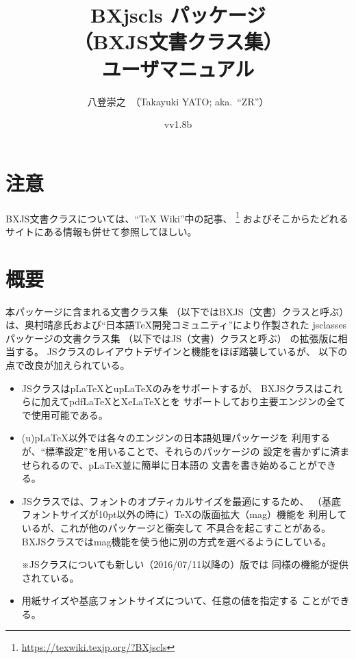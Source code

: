 \documentclass[a4paper]{ltjsarticle}
\renewcommand*{\XeLaTeX}{XeLaTeX}}
\newcommand{\PkgVersion}{v1.8b}
\newcommand{\PkgDate}{2018/04/14}
\newcommand{\Pkg}[1]{\textsf{#1}}
\newcommand{\Note}{\par\noindent ※}
\newcommand{\jemph}{\textsf}
\providecommand{\pLaTeX}{p\LaTeX}
\providecommand{\upLaTeX}{u\pLaTeX}
\providecommand{\pdfLaTeX}{pdf\LaTeX}
\begin{document}
\title{\Pkg{BXjscls} パッケージ\\
  （BXJS文書クラス集）\\
  ユーザマニュアル}
\author{八登崇之\ （Takayuki YATO; aka.~``ZR''）}
\date{v\PkgVersion\quad[\PkgDate]}
\maketitle
\tableofcontents

\section*{注意}

BXJS文書クラスについては、“{\TeX} Wiki”中の記事、
\footnote{\url{https://texwiki.texjp.org/?BXjscls}}%
およびそこからたどれるサイトにある情報も併せて参照してほしい。

\section{概要}
\label{sec:Ovewview}

本パッケージに含まれる文書クラス集
（以下では\jemph{BXJS（文書）クラス}と呼ぶ）
は、奥村晴彦氏および“日本語{\TeX}開発コミュニティ”により作製された
\Pkg{jsclasses}パッケージの文書クラス集
（以下では\jemph{JS（文書）クラス}と呼ぶ）
の拡張版に相当する。
JSクラスのレイアウトデザインと機能をほぼ踏襲しているが、
以下の点で改良が加えられている。
\begin{itemize}
\item JSクラスは{\pLaTeX}と{\upLaTeX}のみをサポートするが、
  BXJSクラスはこれらに加えて{\pdfLaTeX}と{\XeLaTeX}と{\LuaLaTeX}を
  サポートしており主要エンジンの全てで使用可能である。
\item (u){\pLaTeX}以外では各々のエンジンの日本語処理パッケージを
  利用するが、“標準設定”を用いることで、それらのパッケージの
  設定を書かずに済ませられるので、{\pLaTeX}並に簡単に日本語の
  文書を書き始めることができる。
\item JSクラスでは、フォントのオプティカルサイズを最適にするため、
  （基底フォントサイズが10pt以外の時に）{\TeX}の版面拡大（mag）機能を
  利用しているが、これが他のパッケージと衝突して
  不具合を起こすことがある。
  BXJSクラスではmag機能を使う他に別の方式を選べるようにしている。
  \Note JSクラスについても新しい（2016/07/11以降の）版では
  同様の機能が提供されている。
\item 用紙サイズや基底フォントサイズについて、任意の値を指定する
  ことができる。
\end{itemize}
\end{document}
